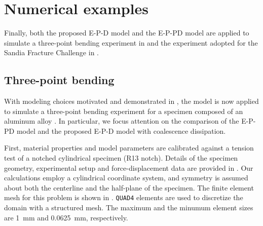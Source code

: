\section{Numerical examples}
\label{section: Chapter5/examples}

Finally, both the proposed E-P-D model and the E-P-PD model are applied to simulate a three-point bending experiment in  and the experiment adopted for the Sandia Fracture Challenge in .

\subsection{Three-point bending}
\label{section: Chapter5/examples/3pb}

With modeling choices motivated and demonstrated in , the model is now applied to simulate a three-point bending experiment for a specimen composed of an aluminum alloy \cite{kubik2019ductile}. In particular, we focus attention on the comparison of the E-P-PD model and the proposed E-P-D model with coalescence dissipation.

First, material properties and model parameters are calibrated against a tension test of a notched cylindrical specimen (R13 notch). Details of the specimen geometry, experimental setup and force-displacement data are provided in \cite{kubik2018notched}. Our calculations employ a cylindrical coordinate system, and symmetry is assumed about both the centerline and the half-plane of the specimen. The finite element mesh for this problem is shown in . \texttt{QUAD4} elements are used to discretize the domain with a structured mesh. The maximum and the minumum element sizes are \SI{1}{\milli\meter} and \SI{0.0625}{\milli\meter}, respectively.

